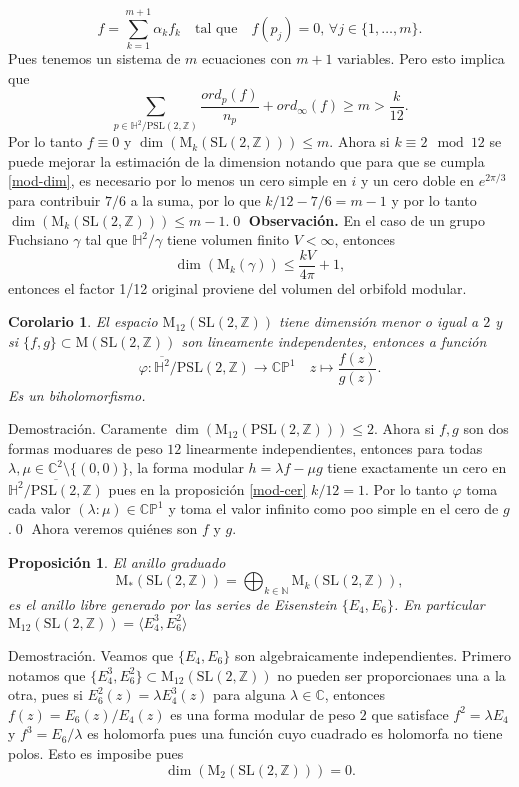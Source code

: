 \documentclass[letterpaper]{article}
\newtheorem{prop}[teorema]{Proposici\'on}
\newtheorem{cor}[teorema]{Corolario}
\newcommand{\nat}{\ensuremath{ \mathbb N }}
\newcommand{\obs}{{\newline \noindent \sc \textbf{Observación. }}}
\newcommand{\dem}{{\noindent \sc Demostraci\'on. }}
\newcommand{\ga}{\ensuremath{\gamma}}
\newcommand{\co}{\ensuremath{\mathbb C }}
\newcommand{\cp}{\ensuremath{\mathbb{CP}}}
\newcommand{\pslz}{\ensuremath{\mathrm{PSL}(2,\mathbb Z) }}
\newcommand{\hd}{\ensuremath{\mathbb H^2}}
\newcommand{\slz}{\ensuremath{\mathrm{SL}(2,\mathbb Z) }}
\newcommand{\mdlr}{\ensuremath{\mathrm{M}}}
\begin{document}
\[
    f=\sum_{k=1}^{m+1}\alpha_kf_k\quad\text{tal que}\quad f(p_j)=0,\,\forall j\in\{1,\dots,m\}.
\]
Pues tenemos un sistema de \(m\) ecuaciones con \(m+1\) variables. Pero esto implica que
\[
    \sum_{p\in\hd/\pslz} \frac{ord_p(f)}{n_p}+ord_{\infty}(f)\geq m>\frac{k}{12}.
\]
Por lo tanto \(f\equiv0\) y \(\dim(\mdlr_k(\slz))\leq m\). Ahora si \(k\equiv2\mod12\) se puede mejorar la estimación de la dimension notando que para que se cumpla \ref{mod-dim}, es necesario por lo menos un cero simple en \(i\) y un cero doble en \(e^{2\pi/3}\) para contribuir \(7/6\) a la suma, por lo que \(k/12-7/6=m-1\) y  por lo tanto \(\dim(\mdlr_k(\slz))\leq m-1\).\qed
\obs En el caso de un grupo Fuchsiano \(\ga\) tal que \(\hd/\ga\) tiene volumen finito \(V<\infty\), entonces
\[
    \dim(\mdlr_k(\ga))\leq \frac{kV}{4\pi}+1,
\]
entonces el factor 1/12 original proviene del volumen del orbifold modular.
\begin{cor}
El espacio \(\mdlr_{12}(\slz)\) tiene dimensión menor o igual a \(2\) y si \(\{f,g\}\subset\mdlr(\slz)\) son lineamente independentes, entonces a función
\[
        \varphi:\overline{\hd}/\pslz\rightarrow\cp^{1}\quad z\mapsto\frac{f(z)}{g(z)}.
\]
Es un biholomorfismo.
\end{cor}
\dem Caramente \(\dim(\mdlr_{12}(\pslz))\leq2\). Ahora si \(f,g\) son dos formas moduares de peso \(12\) linearmente independientes, entonces para todas \(\lambda,\mu\in\co^{2}\setminus\{(0,0)\}\), la forma modular \(h=\lambda f-\mu g\) tiene exactamente un cero en \(\overline{\hd/\pslz}\) pues en la proposición \ref{mod-cer} \(k/12=1\). Por lo tanto \(\varphi\) toma cada valor \((\lambda:\mu)\in\cp^1\) y toma el valor infinito como poo simple en el cero de \(g\).\qed
\noindent Ahora veremos quiénes son \(f\) y \(g\).
\begin{prop}
El anillo graduado
\[
    \mdlr_{*}(\slz)=\bigoplus_{k\in\nat}\mdlr_k(\slz),
\]
es el anillo libre generado por las series de Eisenstein \(\{E_4,E_6\}\). En particular \(\mdlr_{12}(\slz)=\langle E_4^{3},E_6^{2}\rangle\)
\end{prop}
\dem Veamos que \(\{E_4,E_6\}\) son algebraicamente independientes. Primero notamos que \(\{E_4^{3},E_6^{2}\}\subset\mdlr_{12}(\slz)\) no pueden ser proporcionaes una a la otra, pues si \(E_6^2(z)=\lambda E_4^3(z)\) para alguna \(\lambda\in\co\), entonces \(f(z)=E_6(z)/E_4(z)\) es una forma modular de peso \(2\) que satisface \(f^2=\lambda E_4\) y \(f^3=E_6/\lambda\) es holomorfa pues una función cuyo cuadrado es holomorfa no tiene polos. Esto es imposibe pues
\[
    \dim(\mdlr_2(\slz))=0.
\]
\end{document}
